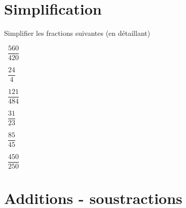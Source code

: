 
\section{Simplification}

Simplifier les fractions suivantes (en détaillant)
\begin{questions}
	
	
	\question[2]  $\dfrac{560}{420}$
	\fillwithdottedlines{1.5cm}
	\begin{solution}
		
	\end{solution}
	
	
	
		
	\question[2]  $\dfrac{24}{4}$
	\fillwithdottedlines{1.5cm}
	\begin{solution}
		
	\end{solution}
	
	



	\question[2]  $\dfrac{121}{484}$
	\fillwithdottedlines{1.5cm}
	\begin{solution}
		
	\end{solution}

	\question[2]  $\dfrac{31}{23}$
	\fillwithdottedlines{1.5cm}
	\begin{solution}
		
	\end{solution}
	
	
	\question[2]  $\dfrac{85}{45}$
	\fillwithdottedlines{1.5cm}
	\begin{solution}
		
	\end{solution}
	
	
	\question[2]  $\dfrac{450}{250}$
	\fillwithdottedlines{1.5cm}
	\begin{solution}
		
	\end{solution}

\end{questions}

\section{Additions - soustractions}

